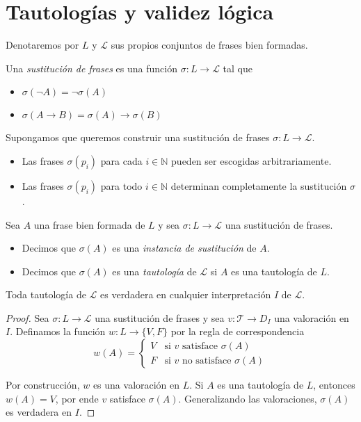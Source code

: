 \chapter{Tautologías y validez lógica}

\begin{notation}
Denotaremos por $L$ y $\mathscr L$ sus propios conjuntos de frases bien formadas.
\end{notation}

\begin{definition}
Una \textit{sustitución de frases} es una función $\sigma : L \to \mathscr L$ tal que
\begin{itemize}
    \item $\sigma(\neg A) = \neg \sigma(A)$
    \item $\sigma(A \to B) = \sigma(A) \to \sigma(B)$
\end{itemize}
\end{definition}

\begin{remarks}
Supongamos que queremos construir una sustitución de frases $\sigma : L \to \mathscr L$.
\begin{itemize}
    \item Las frases $\sigma(p_i)$ para cada $i \in \mathbb N$ pueden ser escogidas arbitrariamente.
    \item Las frases $\sigma(p_i)$ para todo $i \in \mathbb N$ determinan completamente la sustitución $\sigma$.
\end{itemize}
\end{remarks}

\begin{definition}
Sea $A$ una frase bien formada de $L$ y sea $\sigma : L \to \mathscr L$ una sustitución de frases.
\begin{itemize}
    \item Decimos que $\sigma(A)$ es una \textit{instancia de sustitución} de $A$.
    \item Decimos que $\sigma(A)$ es una \textit{tautología} de $\mathscr L$ si $A$ es una tautología de $L$.
\end{itemize}
\end{definition}

\begin{proposition}
Toda tautología de $\mathscr L$ es verdadera en cualquier interpretación $I$ de $\mathscr L$.
\end{proposition}

\begin{proof}
Sea $\sigma : L \to \mathscr L$ una sustitución de frases y sea $v : \mathscr T \to D_I$ una valoración en $I$. Definamos la función $w : L \to \{ V, F \}$ por la regla de correspondencia
$$
w(A) =
\begin{cases}
    V & \text{si } v \text{ satisface } \sigma(A) \\
    F & \text{si } v \text{ no satisface } \sigma(A)
\end{cases}
$$

Por construcción, $w$ es una valoración en $L$. Si $A$ es una tautología de $L$, entonces $w(A) = V$, por ende $v$ satisface $\sigma(A)$. Generalizando las valoraciones, $\sigma(A)$ es verdadera en $I$.
\end{proof}

